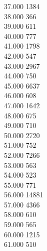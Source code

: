 { 37.000	1384 \\
 38.000	366 \\
 39.000	611 \\
 40.000	777 \\
 41.000	1798 \\
 42.000	547 \\
 43.000	2967 \\
 44.000	750 \\
 45.000	6637 \\
 46.000	608 \\
 47.000	1642 \\
 48.000	675 \\
 49.000	710 \\
 50.000	2720 \\
 51.000	752 \\
 52.000	7266 \\
 53.000	563 \\
 54.000	523 \\
 55.000	771 \\
 56.000	14881 \\
 57.000	4366 \\
 58.000	610 \\
 59.000	565 \\
 60.000	1215 \\
 61.000	510 \\
}
